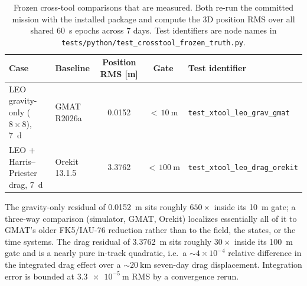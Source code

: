 \documentclass[10pt]{article}
\begin{document}
\begin{table}[htbp]
\centering
\caption{Frozen cross-tool comparisons that are measured. Both re-run the
  committed mission with the installed package and compute the 3D position RMS
  over all shared 60~s epochs across 7 days. Test identifiers are node names in
  \texttt{tests/python/test\_crosstool\_frozen\_truth.py}.}
\label{tab:crosstool}
\small
\begin{tabular}{@{}llS[table-format=1.4]cl@{}}
\toprule
Case & Baseline & {Position RMS [\si{\meter}]} & Gate & Test identifier \\
\midrule
LEO gravity-only ($8\times8$), 7~d & GMAT R2026a & 0.0152 &
  ${<}\,\SI{10}{\meter}$ & \texttt{test\_xtool\_leo\_grav\_gmat} \\
LEO $+$ Harris--Priester drag, 7~d & Orekit 13.1.5 & 3.3762 &
  ${<}\,\SI{100}{\meter}$ & \texttt{test\_xtool\_leo\_drag\_orekit} \\
\bottomrule
\end{tabular}
\end{table}

The gravity-only residual of \SI{0.0152}{\meter} sits roughly $650\times$ inside
its \SI{10}{\meter} gate; a three-way comparison (simulator, GMAT, Orekit)
localizes essentially all of it to GMAT's older FK5/IAU-76 reduction rather than
to the field, the states, or the time systems. The drag residual of
\SI{3.3762}{\meter} sits roughly $30\times$ inside its \SI{100}{\meter} gate and
is a nearly pure in-track quadratic, i.e.\ a $\sim\!4\times10^{-4}$ relative
difference in the integrated drag effect over a $\sim\!\SI{20}{\kilo\meter}$
seven-day drag displacement. Integration error is bounded at
$\SI{3.3e-5}{\meter}$ RMS by a convergence rerun.
\end{document}
